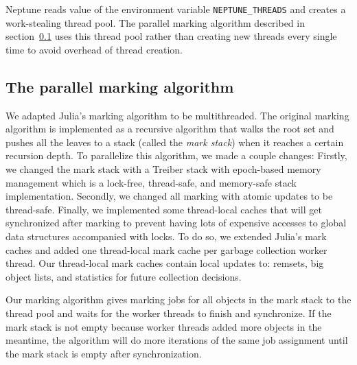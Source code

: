 Neptune reads value of the environment variable \texttt{NEPTUNE\_THREADS} and creates a work-stealing thread pool.
The parallel marking algorithm described in section~\ref{marking_algo} uses this thread pool rather than creating new threads every single time to avoid overhead of thread creation.

\subsection{The parallel marking algorithm}
\label{marking_algo}
We adapted Julia's marking algorithm to be multithreaded.
The original marking algorithm is implemented as a recursive algorithm that walks the root set and pushes all the leaves to a stack (called the \emph{mark stack}) when it reaches a certain recursion depth.
To parallelize this algorithm, we made a couple changes: Firstly, we changed the mark stack with a Treiber stack \cite{???} with epoch-based memory management which is a lock-free, thread-safe, and memory-safe stack implementation.
Secondly, we changed all marking with atomic updates to be thread-safe.
Finally, we implemented some thread-local caches that will get synchronized after marking to prevent having lots of expensive accesses to global data structures accompanied with locks.
To do so, we extended Julia's mark caches and added one thread-local mark cache per garbage collection worker thread.
Our thread-local mark caches contain local updates to: remsets, big object lists, and statistics for future collection decisions.

Our marking algorithm gives marking jobs for all objects in the mark stack to the thread pool and waits for the worker threads to finish and synchronize.
If the mark stack is not empty because worker threads added more objects in the meantime, the algorithm will do more iterations of the same job assignment until the mark stack is empty after synchronization.

